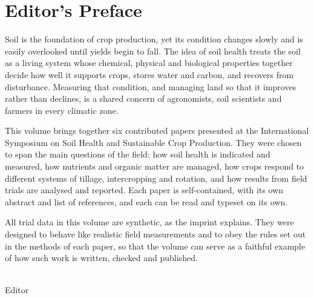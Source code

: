 \chapter{Editor's Preface}

Soil is the foundation of crop production, yet its condition changes slowly
and is easily overlooked until yields begin to fall. The idea of soil health
treats the soil as a living system whose chemical, physical and biological
properties together decide how well it supports crops, stores water and
carbon, and recovers from disturbance. Measuring that condition, and managing
land so that it improves rather than declines, is a shared concern of
agronomists, soil scientists and farmers in every climatic zone.

This volume brings together six contributed papers presented at the
International Symposium on Soil Health and Sustainable Crop Production. They
were chosen to span the main questions of the field: how soil health is
indicated and measured, how nutrients and organic matter are managed, how
crops respond to different systems of tillage, intercropping and rotation, and
how results from field trials are analysed and reported. Each paper is
self-contained, with its own abstract and list of references, and each can be
read and typeset on its own.

All trial data in this volume are synthetic, as the imprint explains. They
were designed to behave like realistic field measurements and to obey the
rules set out in the methods of each paper, so that the volume can serve as a
faithful example of how such work is written, checked and published.

\bigskip
\hfill \volumeeditor\\
\hspace*{\fill} Editor
